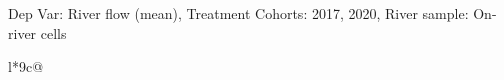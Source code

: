 \begin{table}[H]
\captionlistentry[table]{}
\label{table:beaver_hydrometry_DVflow_mean_SCg23}
\tiny %
Dep Var: River flow (mean), Treatment Cohorts: 2017, 2020, River sample: On-river cells \\
\begin{threeparttable}
\begin{tabulary}{\textwidth}{l*{9}{c}@{}}
\toprule \toprule
\noalign{\smallskip}
\noalign{\smallskip}
\midrule \bottomrule
\end{tabulary}
\medskip
\end{threeparttable}
\end{table}
